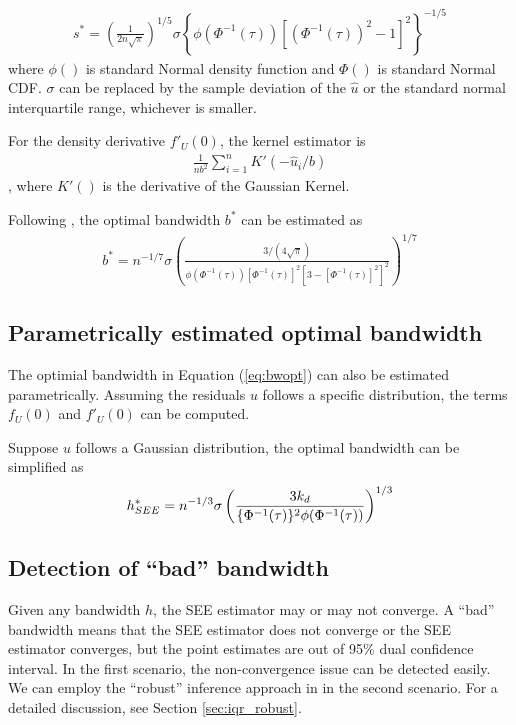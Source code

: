 \begin{align}
  s^* = \left(\frac{1}{2n\sqrt{\pi}}\right)^{1/5}
  \sigma \left\{\phi(\Phi^{-1}(\tau))
  [\left( \Phi^{-1}(\tau) \right)^2 - 1 ]^2 \right\}^{-1/5}
\end{align}
where $\phi()$ is standard Normal density function and $\Phi()$ is standard
Normal CDF. $\sigma$ can be replaced by the sample deviation of the $\hat{u}$
or the standard normal interquartile range, whichever is smaller. 

For the density derivative $f'_U(0)$, the kernel estimator is 
\begin{align}
  \frac{1}{nb^2} \sum_{i=1}^n K'(-\hat{u}_i/b)
\end{align}
, where $K'()$ is the derivative of the Gaussian Kernel.

Following \cite{Wand1995}, the optimal bandwidth $b^*$ can be estimated as 
\begin{align}
b^* =  n^{-1/7}\sigma
\left(
\frac{3/(4\sqrt{\pi})}{
\phi(\Phi^{-1}(\tau)) 
\left[
\Phi^{-1}(\tau)
\right]^2
\left[3 - [\Phi^{-1}(\tau)]^2 \right]^2
}
\right)^{1/7}
\end{align}


\subsection{Parametrically estimated optimal bandwidth}
The optimial bandwidth in Equation (\ref{eq:bwopt}) can also be estimated
parametrically. Assuming the residuals $u$ follows a specific distribution,
the terms $f_U(0)$ and $f'_U(0)$ can be computed.

Suppose $u$ follows a Gaussian distribution, the optimal bandwidth can be
simplified as
\begin{align}
  h^*_{SEE} =
  n^{-1/3}\sigma
  \left(
  	\frac{3 k_d}
	{
	  \{\Phi^{-1}(\tau)\}^2 \phi(\Phi^{-1}(\tau))
      }
      \right)^{1/3}
\end{align}


\subsection{Detection of ``bad'' bandwidth}
Given any bandwidth $h$, the SEE estimator may or may not converge. A ``bad''
bandwidth means that the SEE estimator does not converge or the SEE estimator
converges, but the point estimates are out of 95\% dual confidence interval. In
the first scenario, the non-convergence issue can be detected easily.  We can
employ the ``robust'' inference approach in \cite{Chernozhukov2008} in the
second scenario. For a detailed discussion, see Section \ref{sec:iqr_robust}.


